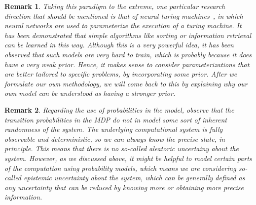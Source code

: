 \documentclass[a4paper]{report}
\theoremstyle{definition}
\theoremstyle{plain}
\newtheorem{remark}{Remark}[chapter]
\begin{document}
\begin{remark}
  Taking this paradigm to the extreme, one particular research direction that
  should be mentioned is that of neural turing
  machines~\cite{gravesNeuralTuringMachines2014}, in which neural networks are
  used to parameterize the execution of a turing machine.
%
It has been demonstrated that simple algorithms like sorting or information
retrieval can be learned in this way.
%
Although this is a very powerful idea, it has been observed that such models are
very hard to train, which is probably because it does have a very weak prior.
%
Hence, it makes sense to consider parameterizations that are better tailored to
specific problems, by incorporating some prior.
%
After we formulate our own methodology, we will come back to this by explaining
why our own model can be understood as having a stronger prior.
\end{remark}

\begin{remark}
  Regarding the use of probabilities in the model, observe that the transition
  probabilities in the MDP do not in model some sort of inherent randomness of
  the system.
  The underlying computational system is fully observable and deterministic, so
  we can always know the precise state, in principle.
  This means that there is no so-called \emph{aleatoric uncertainy} about the system.
  However, as we discussed above, it might be helpful to model certain parts of
  the computation using probability models, which means we are considering
  so-called \emph{epistemic uncertainty} about the system, which can be
  generally defined as any uncertainty that can be reduced by knowing more or
  obtaining more precise information.
\end{remark}
\end{document}
